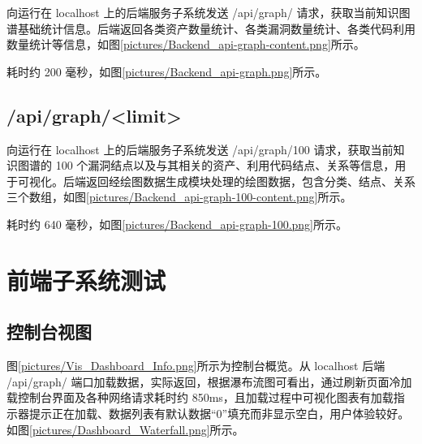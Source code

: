 \documentclass[a4paper,AutoFakeBold,oneside,12pt]{book}
\begin{document}
向运行在 localhost 上的后端服务子系统发送 /api/graph/ 请求，获取当前知识图谱基础统计信息。后端返回各类资产数量统计、各类漏洞数量统计、各类代码利用数量统计等信息，如图\ref{pictures/Backend_api-graph-content.png}所示。


耗时约 200 毫秒，如图\ref{pictures/Backend_api-graph.png}所示。


\subsection{/api/graph/<limit>}

向运行在 localhost 上的后端服务子系统发送 /api/graph/100 请求，获取当前知识图谱的 100 个漏洞结点以及与其相关的资产、利用代码结点、关系等信息，用于可视化。后端返回经绘图数据生成模块处理的绘图数据，包含分类、结点、关系三个数组，如图\ref{pictures/Backend_api-graph-100-content.png}所示。


耗时约 640 毫秒，如图\ref{pictures/Backend_api-graph-100.png}所示。


\section{前端子系统测试}

\subsection{控制台视图}

图\ref{pictures/Vis_Dashboard_Info.png}所示为控制台概览。从 localhost 后端 /api/graph/ 端口加载数据，实际返回，根据瀑布流图可看出，通过刷新页面冷加载控制台界面及各种网络请求耗时约 850ms，且加载过程中可视化图表有加载指示器提示正在加载、数据列表有默认数据“0”填充而非显示空白，用户体验较好。如图\ref{pictures/Dashboard_Waterfall.png}所示。

\end{document}
